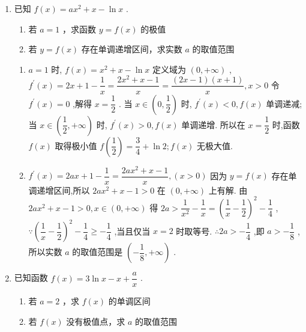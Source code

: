 \begin{enumerate}
    \item 已知 $f\left( x\right)  = a{x}^{2} + x - \ln x$ .
    \begin{enumerate}
        \item 若 $a = 1$ ，求函数 $y = f\left( x\right)$ 的极值
        \item 若 $y = f\left( x\right)$ 存在单调递增区间，求实数 $a$ 的取值范围
    \end{enumerate}
    \begin{jieda}
        \begin{enumerate}
            \item $a = 1$ 时, $f\left( x\right)  = {x}^{2} + x - \ln x$ 定义域为 $\left( {0, + \infty }\right)$ ,
            ${f}^{\prime }\left( x\right)  = {2x} + 1 - \dfrac{1}{x} = \dfrac{2{x}^{2} + x - 1}{x} = \dfrac{\left( {{2x} - 1}\right) \left( {x + 1}\right) }{x},x > 0$
            令 ${f}^{\prime }\left( x\right)  = 0$ ,解得 $x = \dfrac{1}{2}$ .
            当 $x \in  \left( {0,\dfrac{1}{2}}\right)$ 时, ${f}^{\prime }\left( x\right)  < 0,f\left( x\right)$ 单调递减;
            当 $x \in  \left( {\dfrac{1}{2}, + \infty }\right)$ 时, ${f}^{\prime }\left( x\right)  > 0,f\left( x\right)$ 单调递增.
            所以在 $x = \dfrac{1}{2}$ 时,函数 $f\left( x\right)$ 取得极小值 $f\left( \dfrac{1}{2}\right)  = \dfrac{3}{4} + \ln 2;f\left( x\right)$ 无极大值.
            \item ${f}^{\prime }\left( x\right)  = {2ax} + 1 - \dfrac{1}{x} = \dfrac{{2a}{x}^{2} + x - 1}{x},\left( {x > 0}\right)$
            因为 $y = f\left( x\right)$ 存在单调递增区间,所以 ${2a}{x}^{2} + x - 1 > 0$ 在 $\left( {0, + \infty }\right)$ 上有解.
            由 ${2a}{x}^{2} + x - 1 > 0,x \in  \left( {0, + \infty }\right)$ 得 ${2a} > \dfrac{1}{{x}^{2}} - \dfrac{1}{x} = {\left( \dfrac{1}{x} - \dfrac{1}{2}\right) }^{2} - \dfrac{1}{4}$ ,
            $\because {\left( \dfrac{1}{x} - \dfrac{1}{2}\right) }^{2} - \dfrac{1}{4} \geq   - \dfrac{1}{4}$ ,当且仅当 $x = 2$ 时取等号.
            $\therefore {2a} >  - \dfrac{1}{4}$ ,即 $a >  - \dfrac{1}{8}$ ,
            所以实数 $a$ 的取值范围是 $\left( {-\dfrac{1}{8}, + \infty }\right)$ .
        \end{enumerate}
    \end{jieda}
    \item 已知函数 $f\left( x\right)  = 3\ln x - x + \dfrac{a}{x}$ .
    \begin{enumerate}
        \item 若 $a = 2$ ，求 $f\left( x\right)$ 的单调区间
        \item 若 $f\left( x\right)$ 没有极值点，求 $a$ 的取值范围

\end{enumerate}
\end{enumerate}
